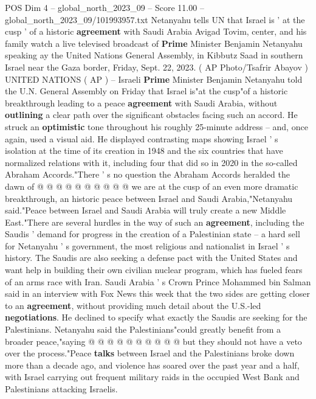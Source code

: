 \begin{textsample}{POS Dim 4 – global\_north\_2023\_09 – Score 11.00 – global\_north\_2023\_09/101993957.txt}  \label{ex:f4_pos_411}
Netanyahu tells UN that Israel is ' at the cusp ' of a historic \textbf{agreement} with Saudi Arabia Avigad Tovim, center, and his family watch a live televised broadcast of \textbf{Prime} Minister Benjamin Netanyahu speaking ay the United Nations General Assembly, in Kibbutz Saad in southern Israel near the Gaza border, Friday, Sept. 22, 2023. ( AP Photo/Tsafrir Abayov ) UNITED NATIONS ( AP ) -- Israeli \textbf{Prime} Minister Benjamin Netanyahu told the U.N.
General Assembly on Friday that Israel is"at the cusp"of a historic breakthrough leading to a peace \textbf{agreement} with Saudi Arabia, without \textbf{outlining} a clear path over the significant obstacles facing such an accord.
He struck an \textbf{optimistic} tone throughout his roughly 25-minute address -- and, once again, used a visual aid.
He displayed contrasting maps showing Israel ' s isolation at the time of its creation in 1948 and the six countries that have normalized relations with it, including four that did so in 2020 in the so-called Abraham Accords."There ' s no question the Abraham Accords heralded the dawn of @ @ @ @ @ @ @ @ @ @ we are at the cusp of an even more dramatic breakthrough, an historic peace between Israel and Saudi Arabia,"Netanyahu said."Peace between Israel and Saudi Arabia will truly create a new Middle East."There are several hurdles in the way of such an \textbf{agreement}, including the Saudis ' demand for progress in the creation of a Palestinian state -- a hard sell for Netanyahu ' s government, the most religious and nationalist in Israel ' s history.
The Saudis are also seeking a defense pact with the United States and want help in building their own civilian nuclear program, which has fueled fears of an arms race with Iran.
Saudi Arabia ' s Crown Prince Mohammed bin Salman said in an interview with Fox News this week that the two sides are getting closer to an \textbf{agreement}, without providing much detail about the U.S.-led \textbf{negotiations}.
He declined to specify what exactly the Saudis are seeking for the Palestinians.
Netanyahu said the Palestinians"could greatly benefit from a broader peace,"saying @ @ @ @ @ @ @ @ @ @ but they should not have a veto over the process."Peace \textbf{talks} between Israel and the Palestinians broke down more than a decade ago, and violence has soared over the past year and a half, with Israel carrying out frequent military raids in the occupied West Bank and Palestinians attacking Israelis.

\end{textsample}

